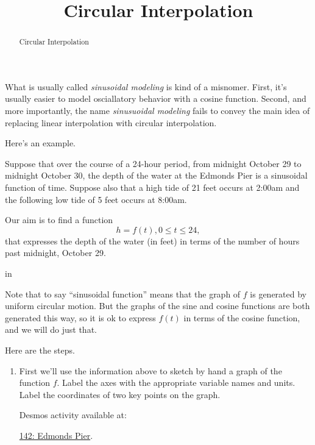 \documentclass{ximera}
\title{Circular Interpolation}
\newcommand{\pskip}{\vskip 0.1 in}
\begin{document}
\begin{abstract}
Circular Interpolation
\end{abstract}
\maketitle


What is usually called \emph{sinusoidal modeling} is kind of a misnomer. First, it's usually easier to model osciallatory behavior with a cosine function. Second, and more importantly, the name \emph{sinusuoidal modeling} fails to convey the main idea of replacing linear interpolation with circular interpolation.

Here's an example.


\begin{example}  \label{E888b0bbdsdsf}
Suppose that over the course of a 24-hour period, from midnight October 29 to midnight October 30, the depth of the water at the Edmonds Pier is a sinusoidal function of time. Suppose also that a high tide of 21 feet occurs at 2:00am and the following low tide of 5 feet occurs at 8:00am. 


\begin{explanation}
Our aim is to find a function
\[
    h = f(t) , 0\leq t \leq 24, 
\]
that expresses the depth of the water (in feet) in terms of the number of hours past midnight, October 29. 

\pskip

Note that to say ``sinusoidal function'' means that the graph of $f$ is generated by uniform circular motion. But the graphs of the sine and cosine functions are both generated this way, so it is ok to express $f(t)$ in terms of the cosine function, and we will do just that.

Here are the steps.

\begin{enumerate}

\item  First we'll use the information above to sketch by hand a graph of the function $f$. Label the axes with the appropriate variable names and units. Label the coordinates of two key points on the graph.

Desmos activity available at:

\href{https://www.desmos.com/calculator/x2kocpkcfm}{142: Edmonds Pier}.

 
\begin{onlineOnly}
    \begin{center}
\end{center}
\end{onlineOnly}




\end{enumerate}
\end{explanation}
\end{example}
\end{document}
